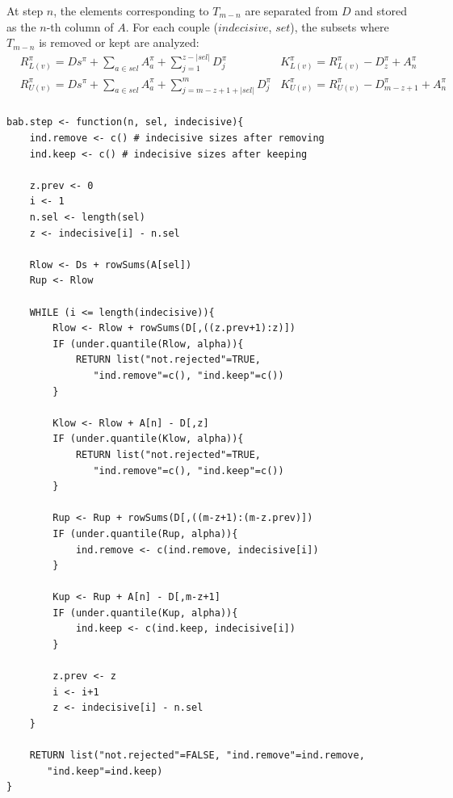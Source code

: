 \documentclass[11pt,a4paper,openright,twoside]{article}
\begin{document}
At step $n$, the elements corresponding to $T_{m-n}$ are separated from $D$ and stored as the $n$-th column of $A$. For each couple ($indecisive$, $set$), the subsets where $T_{m-n}$ is removed or kept are analyzed:
\begin{align*}
& R_{L(v)}^{\pi}=Ds^{\pi}+\sum_{a\in sel}A_a^{\pi}+\sum_{j=1}^{z-|sel|} D_j^{\pi} & K_{L(v)}^{\pi}=R_{L(v)}^{\pi} - D_z^{\pi} + A_n^{\pi}\\
& R_{U(v)}^{\pi}=Ds^{\pi}+\sum_{a\in sel}A_a^{\pi}+\sum_{j=m-z+1+|sel|}^{m} D_j^{\pi} & K_{U(v)}^{\pi}=R_{U(v)}^{\pi} - D_{m-z+1}^{\pi} + A_n^{\pi}\\
\end{align*}
\begin{lstlisting}
bab.step <- function(n, sel, indecisive){
	ind.remove <- c() # indecisive sizes after removing
	ind.keep <- c() # indecisive sizes after keeping

	z.prev <- 0
	i <- 1
	n.sel <- length(sel)
	z <- indecisive[i] - n.sel

	Rlow <- Ds + rowSums(A[sel])
	Rup <- Rlow

	WHILE (i <= length(indecisive)){
		Rlow <- Rlow + rowSums(D[,((z.prev+1):z)])
		IF (under.quantile(Rlow, alpha)){
			RETURN list("not.rejected"=TRUE,
			   "ind.remove"=c(), "ind.keep"=c())
		}

		Klow <- Rlow + A[n] - D[,z]
		IF (under.quantile(Klow, alpha)){
			RETURN list("not.rejected"=TRUE,
			   "ind.remove"=c(), "ind.keep"=c())
		}

		Rup <- Rup + rowSums(D[,((m-z+1):(m-z.prev)])
		IF (under.quantile(Rup, alpha)){
			ind.remove <- c(ind.remove, indecisive[i])
		}

		Kup <- Rup + A[n] - D[,m-z+1]
		IF (under.quantile(Kup, alpha)){
			ind.keep <- c(ind.keep, indecisive[i])
		}

		z.prev <- z
		i <- i+1
		z <- indecisive[i] - n.sel
	}

	RETURN list("not.rejected"=FALSE, "ind.remove"=ind.remove,
	   "ind.keep"=ind.keep)
}
\end{lstlisting}
\end{document}
